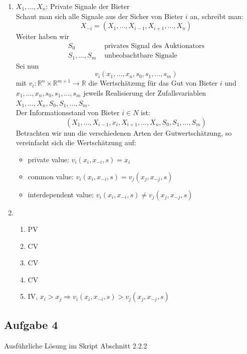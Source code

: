 \documentclass[12pt]{extreport} %
\newcommand{\R}{\mathbb{R}}
\theoremstyle{named}
\theoremstyle{nnamed}
\theoremstyle{itshape}
\theoremstyle{normal}
\begin{document}
\begin{enumerate}
	\item $X_1, \dotsc, X_n$: Private Signale der Bieter ~\\
		Schaut man sich alle Signale aus der Sicher von Bieter $i$ an, schreibt man:
		$$ X_{-i} = \left( X_1, \dotsc, X_{i-1}, X_{i+1}, \dotsc, X_{n} \right) $$
		Weiter haben wir
		\begin{align*}
			S_{0} & \text{ privates Signal des Auktionators} \\
			S_{1}, \dotsc, S_{m} & \text{ unbeobachtbare Signale}
		\end{align*}	
		Sei nun 
		$$ v_{i}(x_1, \dotsc, x_{n}, s_{0}, s_{1}, \dotsc, s_{m}) $$
		mit $v_i \colon \R^{n} \times \R^{m+1} \rightarrow \R$ die Wertschätzung für das Gut von Bieter $i$ und $x_1, \dotsc, x_{n}, s_{0}, s_{1}, \dotsc, s_{m}$ jeweils Realisierung der Zufallsvariablen $X_1, \dotsc, X_n, S_0, S_1, \dotsc, S_m$. ~\\
		
		Der Informationsstand von Bieter $i \in N$ ist:
			$$ \left( X_1, \dotsc, X_{i-1}, x_i, X_{i+1}, \dotsc, X_n, S_0, S_1, \dotsc, S_m \right) $$
		Betrachten wir nun die verschiedenen Arten der Gutwertschätzung, so vereinfacht sich die Wertschätzung auf:
		\begin{itemize}
			\item private value: $v_i(x_i, x_{-i}, s) = x_i$
			\item common value: $v_i(x_i, x_{-i}, s) = v_{j}(x_{j}, x_{-j}, s)$
			\item interdependent value: $v_i(x_i, x_{-i}, s) \neq v_{j}(x_{j}, x_{-j}, s)$
		\end{itemize}
	\item \begin{enumerate}[label=\arabic*\upshape)]
		\item PV
		\item CV
		\item CV
		\item CV
		\item IV, $x_i > x_j \Rightarrow v_i(x_i, x_{-i}, s) > v_j(x_j, x_{-j}, s)$
	\end{enumerate}
\end{enumerate}

\subsection*{Aufgabe 4}

Ausführliche Lösung im Skript Abschnitt 2.2.2
\end{document}
